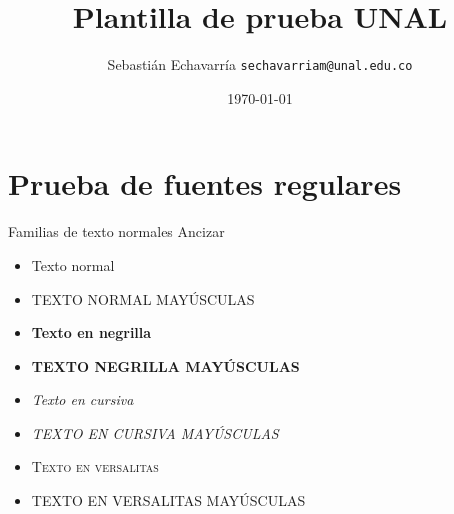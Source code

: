 \documentclass[]{beamer} %
\title{Plantilla de prueba UNAL}
\date[ISPN ’80]{\today}
\author[Sebasti\'an Echavarr\'ia ]{Sebasti\'an Echavarr\'ia \texttt{sechavarriam@unal.edu.co}}
\begin{document}
	
	\begin{frame}\end{frame} %
	
	
	\begin{frame} %
		\titlepage
	\end{frame}

\begin{frame} 
	\tableofcontents[pausesections]
\end{frame}


\section{Prueba de fuentes regulares}

\begin{frame}{Familias de texto normales Ancizar}
	\begin{itemize}
	\item  Texto normal\\
	\item  TEXTO NORMAL MAYÚSCULAS\\
	\item  \textbf{Texto en negrilla}\\
	\item  \textbf{TEXTO NEGRILLA MAYÚSCULAS}\\
	\item  \textit{Texto en cursiva}\\
	\item  \textit{TEXTO EN CURSIVA MAYÚSCULAS}\\
	\item  \textsc{Texto en versalitas}\\
	\item  \textsc{TEXTO EN VERSALITAS MAYÚSCULAS}
	\end{itemize}
	
\end{frame}
\end{document}
